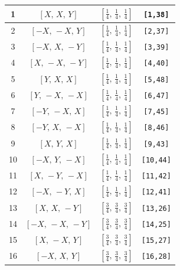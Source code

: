 \documentclass[fleqn,8pt]{jsarticle}
\begin{document}
\begin{longtable}{cccc}
1 & $\left[ X,\, X,\, Y \right]$ & $\left[ \frac{1}{4},\, \frac{1}{4},\, \frac{1}{4} \right]$ & {\tt [1,38]} \\ \hline
2 & $\left[ - X,\, - X,\, Y \right]$ & $\left[ \frac{1}{4},\, \frac{1}{4},\, \frac{1}{4} \right]$ & {\tt [2,37]} \\ \hline
3 & $\left[ - X,\, X,\, - Y \right]$ & $\left[ \frac{1}{4},\, \frac{1}{4},\, \frac{1}{4} \right]$ & {\tt [3,39]} \\ \hline
4 & $\left[ X,\, - X,\, - Y \right]$ & $\left[ \frac{1}{4},\, \frac{1}{4},\, \frac{1}{4} \right]$ & {\tt [4,40]} \\ \hline
5 & $\left[ Y,\, X,\, X \right]$ & $\left[ \frac{1}{4},\, \frac{1}{4},\, \frac{1}{4} \right]$ & {\tt [5,48]} \\ \hline
6 & $\left[ Y,\, - X,\, - X \right]$ & $\left[ \frac{1}{4},\, \frac{1}{4},\, \frac{1}{4} \right]$ & {\tt [6,47]} \\ \hline
7 & $\left[ - Y,\, - X,\, X \right]$ & $\left[ \frac{1}{4},\, \frac{1}{4},\, \frac{1}{4} \right]$ & {\tt [7,45]} \\ \hline
8 & $\left[ - Y,\, X,\, - X \right]$ & $\left[ \frac{1}{4},\, \frac{1}{4},\, \frac{1}{4} \right]$ & {\tt [8,46]} \\ \hline
9 & $\left[ X,\, Y,\, X \right]$ & $\left[ \frac{1}{4},\, \frac{1}{4},\, \frac{1}{4} \right]$ & {\tt [9,43]} \\ \hline
10 & $\left[ - X,\, Y,\, - X \right]$ & $\left[ \frac{1}{4},\, \frac{1}{4},\, \frac{1}{4} \right]$ & {\tt [10,44]} \\ \hline
11 & $\left[ X,\, - Y,\, - X \right]$ & $\left[ \frac{1}{4},\, \frac{1}{4},\, \frac{1}{4} \right]$ & {\tt [11,42]} \\ \hline
12 & $\left[ - X,\, - Y,\, X \right]$ & $\left[ \frac{1}{4},\, \frac{1}{4},\, \frac{1}{4} \right]$ & {\tt [12,41]} \\ \hline
13 & $\left[ X,\, X,\, - Y \right]$ & $\left[ \frac{3}{4},\, \frac{3}{4},\, \frac{3}{4} \right]$ & {\tt [13,26]} \\ \hline
14 & $\left[ - X,\, - X,\, - Y \right]$ & $\left[ \frac{3}{4},\, \frac{3}{4},\, \frac{3}{4} \right]$ & {\tt [14,25]} \\ \hline
15 & $\left[ X,\, - X,\, Y \right]$ & $\left[ \frac{3}{4},\, \frac{3}{4},\, \frac{3}{4} \right]$ & {\tt [15,27]} \\ \hline
16 & $\left[ - X,\, X,\, Y \right]$ & $\left[ \frac{3}{4},\, \frac{3}{4},\, \frac{3}{4} \right]$ & {\tt [16,28]} \\ \hline

\end{longtable}
\end{document}
